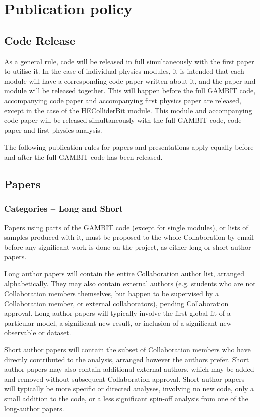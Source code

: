 \section{Publication policy}

\subsection{Code Release}

As a general rule, code will be released in full simultaneously with the first paper to utilise it.  In the case of individual physics modules, it is intended that each module will have a corresponding code paper written about it, and the paper and module will be released together.  This will happen before the full GAMBIT code, accompanying code paper and accompanying first physics paper are released, except in the case of the HEColliderBit module.  This module and accompanying code paper will be released simultaneously with the full GAMBIT code, code paper and first physics analysis.

The following publication rules for papers and presentations apply equally before and after the full GAMBIT code has been released.

\subsection{Papers}

\subsubsection{Categories -- Long and Short}

Papers using parts of the GAMBIT code (except for single modules), or lists of samples produced with it, must be proposed to the whole Collaboration by email before any significant work is done on the project, as either long or short author papers.  

Long author papers will contain the entire Collaboration author list, arranged alphabetically.  They may also contain external authors (e.g. students who are not Collaboration members themselves, but happen to be supervised by a Collaboration member, or external collaborators), pending Collaboration approval.  Long author papers will typically involve the first global fit of a particular model, a significant new result, or inclusion of a significant new observable or dataset.

Short author papers will contain the subset of Collaboration members who have directly contributed to the analysis, arranged however the authors prefer.  Short author papers may also contain additional external authors, which may be added and removed without subsequent Collaboration approval.  Short author papers will typically be more specific or directed analyses, involving no new code, only a small addition to the code, or a less significant spin-off analysis from one of the long-author papers.

